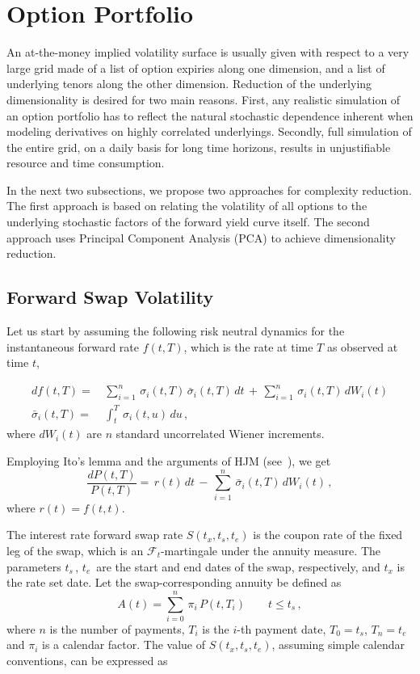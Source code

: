 \documentclass[12pt,oneside]{article}
\newcommand{\beqn}{\begin{equation}}
\newcommand{\eeqn}{\end{equation}}
\numberwithin{equation}{section}
\begin{document}
\section{Option Portfolio}
An at-the-money implied volatility surface is usually given with respect to a very large grid
made of a list of option expiries along one dimension, and a list of underlying tenors
along the other dimension.
Reduction of the underlying dimensionality is desired for two main reasons.
First, any realistic simulation of an option portfolio has to reflect the natural stochastic 
dependence inherent when modeling derivatives on highly correlated underlyings.
Secondly, full simulation of the entire grid, on a daily basis for long time horizons,
results in unjustifiable resource and time consumption.

In the next two subsections,
we propose two approaches for complexity reduction.
The first approach is based on relating the volatility of all options to the underlying
stochastic factors of the forward yield curve itself.
The second approach uses Principal Component Analysis (PCA) to
achieve dimensionality reduction.

\subsection{Forward Swap Volatility}
Let us start by assuming the following risk neutral dynamics for the instantaneous forward rate $f(t,T)$,
which is the rate at time $T$ as observed at time $t$,

\beqn\label{eq:forwards}
\begin{aligned}
df(t,T)=&\,\sum_{i=1}^n\,\sigma_i(t,T)\,\bar{\sigma}_i(t,T)\,dt\,+\,\sum_{i=1}^n\,\sigma_i(t,T)\,dW_i(t)\\
\bar{\sigma}_i(t,T)=&\,\int_t^T\,\sigma_i(t,u)\,du\,,
\end{aligned}
\eeqn
where $dW_i(t)$ are $n$ standard uncorrelated Wiener increments.

Employing Ito's lemma and the arguments of HJM (see~\cite{HJM}), we get
\beqn
\frac{dP(t,T)}{P(t,T)}=\,r(t)\,dt \,-
\,\sum_{i=1}^n\,\bar{\sigma}_i(t,T)\,dW_i(t)\,,
\eeqn
where $r(t)=f(t,t)$.

The interest rate forward swap rate $S(t_x,t_s,t_e)$ is the coupon rate of the
fixed leg of the swap, which is an $\mathcal{F}_t$-martingale under the annuity measure.
The parameters $t_s\,$, $t_e\,$ are the start and end dates of the swap, respectively,
and $t_x$ is the rate set date.
Let the swap-corresponding annuity be defined as
\beqn
A(t)=\sum_{i=0}^n\,\pi_i\,P(t,T_i)\qquad t\le t_s\,,
\eeqn
where $n$ is the number of payments, $T_i$ is the $i$-th payment date,
$T_0=t_s$, $T_n=t_e$ and
$\pi_i$ is a calendar factor.
The value of $S(t_x,t_s,t_e)$, assuming simple calendar conventions, can be expressed as
\end{document}
